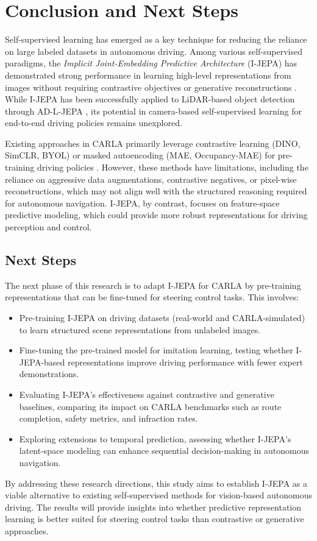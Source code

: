 \documentclass{article}
\begin{document}
\section{Conclusion and Next Steps}

Self-supervised learning has emerged as a key technique for reducing the reliance on large labeled datasets in autonomous driving. Among various self-supervised paradigms, the \textit{Implicit Joint-Embedding Predictive Architecture} (I-JEPA) has demonstrated strong performance in learning high-level representations from images without requiring contrastive objectives or generative reconstructions \citep{assran2023self}. While I-JEPA has been successfully applied to LiDAR-based object detection through AD-L-JEPA \citep{zhu2025ad}, its potential in camera-based self-supervised learning for end-to-end driving policies remains unexplored.

Existing approaches in CARLA primarily leverage contrastive learning (DINO, SimCLR, BYOL) or masked autoencoding (MAE, Occupancy-MAE) for pre-training driving policies \citep{juneja2024dino, wu2023policy}. However, these methods have limitations, including the reliance on aggressive data augmentations, contrastive negatives, or pixel-wise reconstructions, which may not align well with the structured reasoning required for autonomous navigation. I-JEPA, by contrast, focuses on feature-space predictive modeling, which could provide more robust representations for driving perception and control.

\subsection{Next Steps}
The next phase of this research is to adapt I-JEPA for CARLA by pre-training representations that can be fine-tuned for steering control tasks. This involves:

\begin{itemize}
    \item Pre-training I-JEPA on driving datasets (real-world and CARLA-simulated) to learn structured scene representations from unlabeled images.
    \item Fine-tuning the pre-trained model for imitation learning, testing whether I-JEPA-based representations improve driving performance with fewer expert demonstrations.
    \item Evaluating I-JEPA’s effectiveness against contrastive and generative baselines, comparing its impact on CARLA benchmarks such as route completion, safety metrics, and infraction rates.
    \item Exploring extensions to temporal prediction, assessing whether I-JEPA’s latent-space modeling can enhance sequential decision-making in autonomous navigation.
\end{itemize}

By addressing these research directions, this study aims to establish I-JEPA as a viable alternative to existing self-supervised methods for vision-based autonomous driving. The results will provide insights into whether predictive representation learning is better suited for steering control tasks than contrastive or generative approaches.

\newpage


\end{document}
